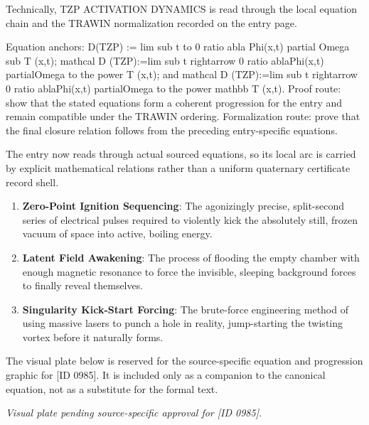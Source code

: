 Technically, TZP ACTIVATION DYNAMICS is read through the local equation chain and the TRAWIN normalization recorded on the entry page.

Equation anchors: D(TZP) := lim sub t to 0 ratio abla Phi(x,t) partial Omega sub T (x,t); mathcal D (TZP):=lim sub t rightarrow 0 ratio ablaPhi(x,t) partialOmega to the power T (x,t); and mathcal D (TZP):=lim sub t rightarrow 0 ratio ablaPhi(x,t) partialOmega to the power mathbb T (x,t). Proof route: show that the stated equations form a coherent progression for the entry and remain compatible under the TRAWIN ordering. Formalization route: prove that the final closure relation follows from the preceding entry-specific equations.

The entry now reads through actual sourced equations, so its local arc is carried by explicit mathematical relations rather than a uniform quaternary certificate record shell.
\endgroup

\begin{enumerate}[leftmargin=1.6em,itemsep=6pt,topsep=4pt]
\item \textbf{Zero-Point Ignition Sequencing}: The agonizingly precise, split-second series of electrical pulses required to violently kick the absolutely still, frozen vacuum of space into active, boiling energy.
\item \textbf{Latent Field Awakening}: The process of flooding the empty chamber with enough magnetic resonance to force the invisible, sleeping background forces to finally reveal themselves.
\item \textbf{Singularity Kick-Start Forcing}: The brute-force engineering method of using massive lasers to punch a hole in reality, jump-starting the twisting vortex before it naturally forms.
\end{enumerate}

\begingroup\footnotesize\sloppy
The visual plate below is reserved for the source-specific equation and progression graphic for [ID 0985]. It is included only as a companion to the canonical equation, not as a substitute for the formal text.
\par\endgroup
\begingroup\footnotesize\itshape
Visual plate pending source-specific approval for [ID 0985].
\par\endgroup

